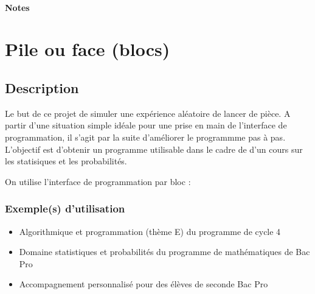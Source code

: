 \documentclass[letterpaper,10pt,french]{sphinxmanual}
\begin{document}
\paragraph{Notes}


\section{Pile ou face (blocs)}
\label{\detokenize{decouverte/pileface-bloc:pile-ou-face-blocs}}\label{\detokenize{decouverte/pileface-bloc::doc}}\label{\detokenize{decouverte/pileface-bloc:blocpileface}}

\subsection{Description}
\label{\detokenize{decouverte/pileface-bloc:description}}
Le but de ce projet de simuler une expérience aléatoire de lancer de pièce.
A partir d’une situation simple idéale pour une prise en main de l’interface
de programmation, il s’agit par la suite d’améliorer le programmme pas à pas.
L’objectif est d’obtenir un programme utilisable dans le cadre de d’un cours sur
les statisiques et les probabilités.

On utilise l’interface de programmation par bloc :



\subsubsection{Exemple(s) d’utilisation}
\label{\detokenize{decouverte/pileface-bloc:exemple-s-d-utilisation}}\begin{itemize}
\item {} 
Algorithmique et programmation (thème E) du programme de cycle 4

\item {} 
Domaine statistiques et probabilités du programme de mathématiques de Bac Pro

\item {} 
Accompagnement personnalisé pour des élèves de seconde Bac Pro

\end{itemize}
\end{document}
